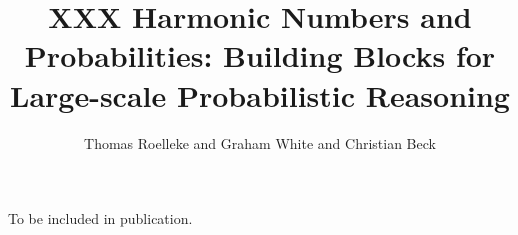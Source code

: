 \documentclass[prodmode,acmjacm]{acmsmall}
\title{XXX Harmonic Numbers and Probabilities: Building Blocks for Large-scale Probabilistic Reasoning}
\author{Thomas Roelleke and Graham White and Christian Beck}
\date{}
\begin{document}
\begin{bottomstuff}

\end{bottomstuff}

\maketitle



\begin{acks}
To be included in publication.
\end{acks}

 
%

%
%
%
%



\end{document}
